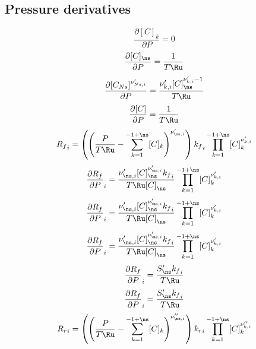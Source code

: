 \documentclass[a4paper,10pt]{article}
\begin{document}
\subsection{Pressure derivatives}
\begin{dmath} \frac{\partial [C]_{k} }{\partial P } = 0\end{dmath} 
\begin{dmath} \frac{\partial [C]_{\ns} }{\partial P } = \frac{1}{T \Ru}\end{dmath} 
\begin{dmath} \frac{\partial [C_{Ns}]^{\nu^{\prime}_{Ns, i}}}{\partial P } = \frac{\nu^{\prime}_{k,i} [C]_{\ns}^{\nu^{\prime}_{k,i} - 1}}{T \Ru}\end{dmath} 
\begin{dmath} \frac{\partial [C] }{\partial P } = \frac{1}{T \Ru}\end{dmath} 
\begin{dmath} {R_f}_{i} = \left(\left(\frac{P}{T \Ru} - \sum_{k=1}^{-1 + \ns} [C]_{k}\right)^{\nu^{\prime}_{\ns,i}}\right) {k_f}_{i} \prod_{k=1}^{-1 + \ns} [C]_{k}^{\nu^{\prime}_{k,i}}\end{dmath} 
\begin{dmath} \frac{\partial {R_f} }{\partial P }_{i} = \frac{\nu^{\prime}_{\ns,i} [C]_{\ns}^{\nu^{\prime}_{\ns,i}} {k_f}_{i}}{T \Ru [C]_{\ns}} \prod_{k=1}^{-1 + \ns} [C]_{k}^{\nu^{\prime}_{k,i}}\end{dmath} 
\begin{dmath} \frac{\partial {R_f} }{\partial P }_{i} = \frac{\nu^{\prime}_{\ns,i} [C]_{\ns}^{\nu^{\prime}_{\ns,i}} {k_f}_{i}}{T \Ru [C]_{\ns}} \prod_{k=1}^{-1 + \ns} [C]_{k}^{\nu^{\prime}_{k,i}}\end{dmath} 
\begin{dmath} \frac{\partial {R_f} }{\partial P }_{i} = \frac{\nu^{\prime}_{\ns,i} [C]_{\ns}^{\nu^{\prime}_{\ns,i}} {k_f}_{i}}{T \Ru [C]_{\ns}} \prod_{k=1}^{-1 + \ns} [C]_{k}^{\nu^{\prime}_{k,i}}\end{dmath} 
\begin{dmath} \frac{\partial {R_f} }{\partial P }_{i} = \frac{S^{\prime}_{\ns} {k_f}_{i}}{T \Ru}\end{dmath} 
\begin{dmath} \frac{\partial {R_f} }{\partial P }_{i} = \frac{S^{\prime}_{\ns} {k_f}_{i}}{T \Ru}\end{dmath} 
\begin{dmath} {R_r}_{i} = \left(\left(\frac{P}{T \Ru} - \sum_{k=1}^{-1 + \ns} [C]_{k}\right)^{\nu^{\prime\prime}_{\ns,i}}\right) {k_r}_{i} \prod_{k=1}^{-1 + \ns} [C]_{k}^{\nu^{\prime\prime}_{k,i}}\end{dmath} 
\end{document}
